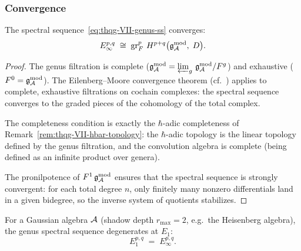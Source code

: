 \subsubsection{Convergence}
\label{subsubsec:thqg-VII-convergence}

\begin{theorem}
\label{thm:thqg-VII-ss-convergence}
The spectral
sequence~\eqref{eq:thqg-VII-genus-ss} converges:
\begin{equation}\label{eq:thqg-VII-convergence}
E_\infty^{p,q}
\;\cong\;
\operatorname{gr}^p_F\, H^{p+q}\bigl(\mathfrak{g}_{\mathcal{A}}^{\mathrm{mod}},\; D\bigr).
\end{equation}
\end{theorem}

\begin{proof}
The genus filtration is complete
($\mathfrak{g}_{\mathcal{A}}^{\mathrm{mod}} = \varprojlim_g\, \mathfrak{g}_{\mathcal{A}}^{\mathrm{mod}} / F^g$) and
exhaustive ($F^0 = \mathfrak{g}_{\mathcal{A}}^{\mathrm{mod}}$). The Eilenberg--Moore
convergence theorem (cf.\ \cite[Theorem~5.5.1]{Wei94})
applies to complete, exhaustive filtrations on cochain
complexes: the spectral sequence converges to the graded
pieces of the cohomology of the total complex.

The completeness condition is exactly the $\hbar$-adic
completeness of
Remark~\ref{rem:thqg-VII-hbar-topology}: the
$\hbar$-adic topology is the linear topology defined by
the genus filtration, and the convolution algebra is complete
(being defined as an infinite product over genera).

The pronilpotence of $F^1\,\mathfrak{g}_{\mathcal{A}}^{\mathrm{mod}}$ ensures that the spectral
sequence is strongly convergent: for each total degree $n$,
only finitely many nonzero differentials land in a given
bidegree, so the inverse system of quotients stabilizes.
\end{proof}

\begin{corollary}
\label{cor:thqg-VII-gaussian-degeneration}
For a Gaussian algebra $\mathcal{A}$ \textup{(}shadow depth $r_{\max} = 2$,
e.g.\ the Heisenberg algebra\textup{)}, the genus spectral
sequence degenerates at $E_1$:
\begin{equation}\label{eq:thqg-VII-gaussian-degeneration}
E_1^{p,q} \;=\; E_\infty^{p,q}.
\end{equation}
\end{corollary}

